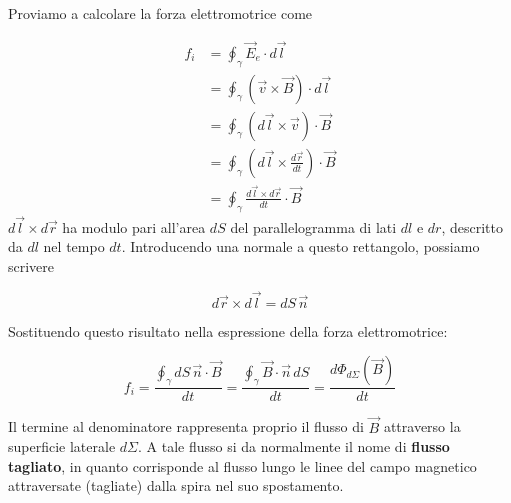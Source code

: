 Proviamo a calcolare la forza elettromotrice come

\begin{equation*}
	\begin{aligned}
		f_i &= \oint_{\gamma} \vec{E}_e\cdot d\vec{l} \\
		&= \oint_{\gamma} (\vec{v} \times \vec{B} )\cdot d\vec{l} \\
		&= \oint_{\gamma} (d\vec{l} \times \vec{v} ) \cdot \vec{B}  \\
		&= \oint_{\gamma} \left(d\vec{l} \times \frac{d\vec{r}}{dt}\right)\cdot \vec{B} \\
		&= \oint_{\gamma} \frac{d\vec{l} \times d\vec{r}}{dt}\cdot \vec{B}
	\end{aligned}
\end{equation*}
$ d\vec{l} \times d\vec{r} $ ha modulo pari all'area $dS$ del parallelogramma di lati $dl$ e $dr$, descritto da $dl$ nel tempo $dt$.
Introducendo una normale a questo rettangolo, possiamo scrivere

\[
	d\vec{r} \times d\vec{l} =dS\,\vec{n}
\]

Sostituendo questo risultato nella espressione della forza elettromotrice:

\[
	f_i = \frac{\oint_{\gamma} dS\,\vec{n} \cdot \vec{B}}{dt} = \frac{\oint_{\gamma} \vec{B} \cdot \vec{n} \,dS}{dt} =\frac{d\Phi_{d\Sigma}(\vec{B} )}{dt}
\]

Il termine al denominatore rappresenta proprio il flusso di $\vec{B}$ attraverso la superficie laterale $ d\Sigma  $. A tale flusso si da normalmente il nome di \textbf{flusso tagliato}, in quanto corrisponde al flusso lungo le linee del campo magnetico attraversate (tagliate) dalla spira nel suo spostamento.

